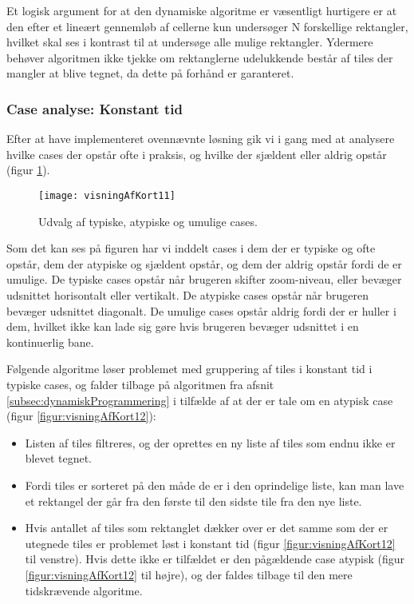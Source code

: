 Et logisk argument for at den dynamiske algoritme er væsentligt hurtigere er at den efter et lineært gennemløb af cellerne kun undersøger N forskellige rektangler, hvilket skal ses i kontrast til at undersøge alle mulige rektangler. Ydermere behøver algoritmen ikke tjekke om rektanglerne udelukkende består af tiles der mangler at blive tegnet, da dette på forhånd er garanteret.

\subsubsection{Case analyse: Konstant tid}
\label{subsec:caseAnalyse}

Efter at have implementeret ovennævnte løsning gik vi i gang med at analysere hvilke cases der opstår ofte i praksis, og hvilke der sjældent eller aldrig opstår (figur \ref{figur:visningAfKort11}).

\begin{figure}[h]
	\centering
	\texttt{[image: visningAfKort11]}
	\captionsetup{width=0.8\textwidth}
	\caption{Udvalg af typiske, atypiske og umulige cases.}
	\label{figur:visningAfKort11}
\end{figure}

Som det kan ses på figuren har vi inddelt cases i dem der er typiske og ofte opstår, dem der atypiske og sjældent opstår, og dem der aldrig opstår fordi de er umulige. De typiske cases opstår når brugeren skifter zoom-niveau, eller bevæger udsnittet horisontalt eller vertikalt. De atypiske cases opstår når brugeren bevæger udsnittet diagonalt. De umulige cases opstår aldrig fordi der er huller i dem, hvilket ikke kan lade sig gøre hvis brugeren bevæger udsnittet i en kontinuerlig bane.

Følgende algoritme løser problemet med gruppering af tiles i konstant tid i typiske cases, og falder tilbage på algoritmen fra afsnit \ref{subsec:dynamiskProgrammering} i tilfælde af at der er tale om en atypisk case (figur \ref{figur:visningAfKort12}):

\begin{itemize}
	\item Listen af tiles filtreres, og der oprettes en ny liste af tiles som endnu ikke er blevet tegnet.
	\item Fordi tiles er sorteret på den måde de er i den oprindelige liste, kan man lave et rektangel der går fra den første til den sidste tile fra den nye liste.
	\item Hvis antallet af tiles som rektanglet dækker over er det samme som der er utegnede tiles er problemet løst i konstant tid (figur \ref{figur:visningAfKort12} til venstre). Hvis dette ikke er tilfældet er den pågældende case atypisk (figur \ref{figur:visningAfKort12} til højre), og der faldes tilbage til den mere tidskrævende algoritme.
\end{itemize}

